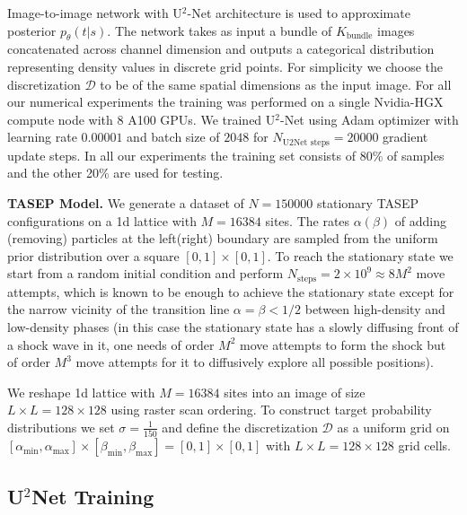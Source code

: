 \documentclass{article}
\theoremstyle{plain}
\theoremstyle{definition}
\theoremstyle{remark}
\begin{document}
\par Image-to-image network with U$^{2}$-Net architecture \cite{qin2020u2} is used to approximate posterior $p_{\theta}(t|s)$. The network takes as input a bundle of $K_{\text{bundle}}$ images concatenated across channel dimension and outputs a categorical distribution representing density values in discrete grid points. For simplicity we choose the discretization $\mathcal{D}$ to be of the same spatial dimensions as the input image. For all our numerical experiments the training was performed on a single Nvidia-HGX compute node with 8 A100 GPUs. We trained U$^{2}$-Net using Adam optimizer with learning rate $0.00001$ and batch size of $2048$ for $N_{\text{U2Net steps}}=20000$ gradient update steps. In all our experiments the training set consists of 80\% of samples and the other 20\% are used for testing.


\textbf{TASEP Model.} We generate a dataset of $N=150000$ stationary TASEP configurations on a 1d lattice with $M=16384$ sites. The rates $\alpha (\beta)$ of adding (removing) particles at the left(right) boundary are sampled from the uniform prior distribution over a square $[0,1] \times [0,1]$. To reach the stationary state we start from a random initial condition and perform $N_{\text{steps}} = 2\times 10^{9} \approx 8 M^2$ move attempts, which is known to be enough to achieve the stationary state except for the narrow vicinity of the transition line $\alpha = \beta<1/2$ between high-density and low-density phases (in this case the stationary state has a slowly diffusing front of a shock wave in it, one needs of order $M^2$ move attempts to form the shock but of order $M^3$ move attempts for it to diffusively explore all possible positions).

We reshape 1d lattice with $M=16384$ sites into an image of size $L\times L =128 \times 128$ using raster scan ordering. To construct target probability distributions we set $\sigma=\frac{1}{150}$ and define the discretization $\mathcal{D}$ as a uniform grid on $[\alpha_{\min}, \alpha_{\max}]\times[\beta_{\min}, \beta_{\max}] = [0,1]\times[0,1]$ with $L\times L =128 \times 128$ grid cells.

\subsection{U$^{2}$Net Training}
\label{subsec:unet_training}
\end{document}
